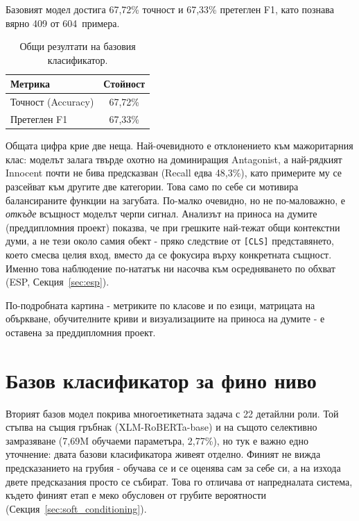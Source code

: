 \documentclass[12pt,a4paper]{report}
\begin{document}
Базовият модел достига 67,72\% точност и 67,33\% претеглен F1, като познава вярно 409 от 604~примера.

\begin{table}[H]
\centering
\caption{Общи резултати на базовия класификатор.}
\label{tab:baseline_results}
\begin{tabular}{lc}
\toprule
\textbf{Метрика} & \textbf{Стойност} \\
\midrule
Точност (Accuracy) & 67,72\% \\
Претеглен F1 & 67,33\% \\
\bottomrule
\end{tabular}
\end{table}

Общата цифра крие две неща. Най-очевидното е отклонението към мажоритарния клас: моделът залага твърде охотно на доминиращия Antagonist, а най-рядкият Innocent почти не бива предсказван (Recall едва 48,3\%), като примерите му се разсейват към другите две категории. Това само по себе си мотивира балансираните функции на загубата. По-малко очевидно, но не по-маловажно, е \textit{откъде} всъщност моделът черпи сигнал. Анализът на приноса на думите (преддипломния проект) показва, че при грешките най-тежат общи контекстни думи, а не тези около самия обект - пряко следствие от \texttt{[CLS]} представянето, което смесва целия вход, вместо да се фокусира върху конкретната същност. Именно това наблюдение по-нататък ни насочва към осредняването по обхват (ESP, Секция~\ref{sec:esp}).

По-подробната картина - метриките по класове и по езици, матрицата на объркване, обучителните криви и визуализациите на приноса на думите - е оставена за преддипломния проект.


\section{Базов класификатор за фино ниво}
\label{sec:fine_baseline}

Вторият базов модел покрива многоетикетната задача с 22 детайлни роли. Той стъпва на същия гръбнак (XLM-RoBERTa-base) и на същото селективно замразяване (7,69M обучаеми параметъра, 2,77\%), но тук е важно едно уточнение: двата базови класификатора живеят отделно. Финият не вижда предсказанието на грубия - обучава се и се оценява сам за себе си, а на изхода двете предсказания просто се събират. Това го отличава от напредналата система, където финият етап е меко обусловен от грубите вероятности (Секция~\ref{sec:soft_conditioning}).
\end{document}

